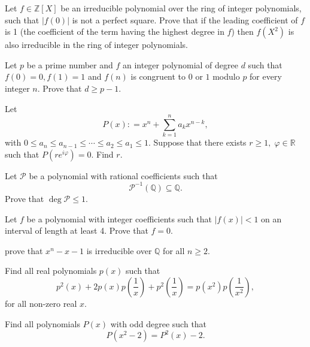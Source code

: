 \begin{question}
Let $f\in\mathbb{Z}[X]$ be an irreducible polynomial over the ring  of integer polynomials, such that $|f(0)|$ is not a perfect square. Prove that if the leading coefficient of $f$ is 1 (the coefficient of the term having the highest degree in $f$) then $f(X^2)$ is also irreducible in the ring of integer polynomials.
\end{question}



\begin{question}
Let $ p$ be a prime number and $ f$ an integer polynomial of degree $ d$ such that $ f(0) = 0,f(1) = 1$ and $ f(n)$ is congruent to $ 0$ or $ 1$ modulo $ p$ for every integer $ n$. Prove that $ d\geq p - 1$.
\end{question}



\begin{question}
Let \[P(x): =x^{n}+\sum\limits_{k=1}^{n}a_kx^{n-k},\] with $0\leq a_n\leq a_{n-1}\leq \cdots \leq a_2\leq a_1\le 1$. Suppose that there exists $r\ge 1 ,\; \varphi \in {\mathbb R}$  such that  $P(re^{i\varphi})=0$. Find $r$.
\end{question}



\begin{question}
Let $\mathcal P$ be a polynomial with rational coefficients such that
\[\mathcal P^{-1}(\mathbb{Q}) \subseteq \mathbb{Q}.\]
Prove that $\deg\mathcal P \leq 1$.
\end{question}


\begin{question}
Let $f$ be a polynomial with integer coefficients such that $|f(x)|<1$ on an interval of length at least 4. Prove that  $f=0$.
\end{question}


\begin{question}
prove that $x^n-x-1$ is irreducible over $\mathbb{Q}$ for all $n \geq 2$.
\end{question}



\begin{question}
Find all real polynomials $p(x)$ such that 
\[p^{2}(x)+2p(x)p\left(\frac{1}{x}\right)+p^{2}\left(\frac{1}{x}\right) = p(x^{2})p\left(\frac{1}{x^{2}}\right),\]
for all non-zero real $x$.
\end{question}



\begin{question}
Find all polynomials $P(x)$ with odd degree such that 
\[P(x^{2}-2)=P^{2}(x)-2.\]
\end{question}



